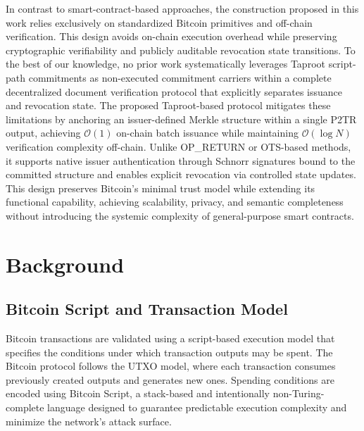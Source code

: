 \documentclass{IEEEoj}
\begin{document}
In contrast to smart-contract-based approaches, the construction proposed in this work relies exclusively on standardized Bitcoin primitives and off-chain verification. This design avoids on-chain execution overhead while preserving cryptographic verifiability and publicly auditable revocation state transitions. To the best of our knowledge, no prior work systematically leverages Taproot script-path commitments as non-executed commitment carriers within a complete decentralized document verification protocol that explicitly separates issuance and revocation state. The proposed Taproot-based protocol mitigates these limitations by anchoring an issuer-defined Merkle structure within a single P2TR output, achieving $\mathcal{O}(1)$ on-chain batch issuance while maintaining $\mathcal{O}(\log N)$ verification complexity off-chain. Unlike OP\_RETURN or OTS-based methods, it supports native issuer authentication through Schnorr signatures bound to the committed structure and enables explicit revocation via controlled state updates. This design preserves Bitcoin’s minimal trust model while extending its functional capability, achieving scalability, privacy, and semantic completeness without introducing the systemic complexity of general-purpose smart contracts.






\section{Background}
\label{sec.background}

\subsection{Bitcoin Script and Transaction Model}

Bitcoin transactions are validated using a script-based execution model that specifies the conditions under which transaction outputs may be spent. 
The Bitcoin protocol follows the UTXO model, where each transaction consumes previously created outputs and generates new ones. Spending conditions are encoded using Bitcoin Script, a stack-based and intentionally non-Turing-complete language designed to guarantee predictable execution complexity and minimize the network's attack surface. 
\end{document}
